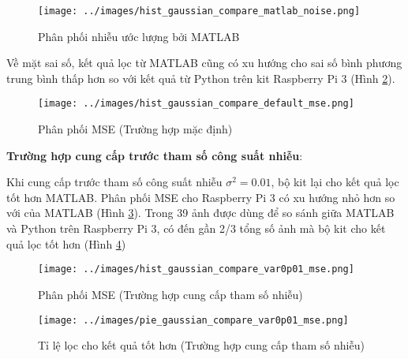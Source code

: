 \begin{figure}[H]
    \centering
    \texttt{[image: ../images/hist\_gaussian\_compare\_matlab\_noise.png]}
    \caption{Phân phối nhiễu ước lượng bởi MATLAB}
    \label{fig:hist_gaussian_compare_matlab_noise}
\end{figure}

Về mặt sai số, kết quả lọc từ MATLAB cũng có xu hướng cho sai số bình phương trung bình 
thấp hơn so với kết quả từ Python trên kit Raspberry Pi 3 (Hình \ref{fig:hist_gaussian_compare_default_mse}).

\begin{figure}[H]
    \centering
    \texttt{[image: ../images/hist\_gaussian\_compare\_default\_mse.png]}
    \caption{Phân phối MSE (Trường hợp mặc định)}
    \label{fig:hist_gaussian_compare_default_mse}
\end{figure}

\begin{center}
    \textbf{Trường hợp cung cấp trước tham số công suất nhiễu}:
\end{center}

Khi cung cấp trước tham số công suất nhiễu $\sigma^2 = 0.01$, 
bộ kit lại cho kết quả lọc tốt hơn MATLAB.
Phân phối MSE cho Raspberry Pi 3 có xu hướng nhỏ hơn so với của MATLAB (Hình \ref{fig:hist_gaussian_compare_var0p01_mse}).
Trong 39 ảnh được dùng để so sánh giữa MATLAB và Python trên Raspberry Pi 3, có đến gần 2/3 tổng số ảnh mà bộ kit cho kết quả lọc tốt hơn (Hình \ref{fig:pie_gaussian_compare_var0p01_mse})

\begin{figure}[H]
    \centering
    \texttt{[image: ../images/hist\_gaussian\_compare\_var0p01\_mse.png]}
    \caption{Phân phối MSE (Trường hợp cung cấp tham số nhiễu)}
    \label{fig:hist_gaussian_compare_var0p01_mse}
\end{figure}

\begin{figure}[H]
    \centering
    \texttt{[image: ../images/pie\_gaussian\_compare\_var0p01\_mse.png]}
    \caption{Tỉ lệ lọc cho kết quả tốt hơn (Trường hợp cung cấp tham số nhiễu)}
    \label{fig:pie_gaussian_compare_var0p01_mse}
\end{figure}